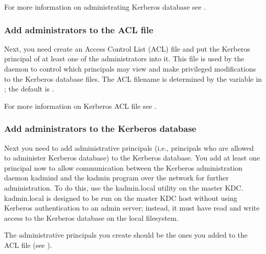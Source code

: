 \documentclass[letterpaper,10pt,english]{sphinxmanual}
\begin{document}
For more information on administrating Kerberos database see
{\hyperref[\detokenize{admin/database:db-operations}]{}}.


\subsubsection{Add administrators to the ACL file}
\label{\detokenize{admin/install_kdc:add-administrators-to-the-acl-file}}\label{\detokenize{admin/install_kdc:admin-acl}}
Next, you need create an Access Control List (ACL) file and put the
Kerberos principal of at least one of the administrators into it.
This file is used by the {\hyperref[\detokenize{admin/admin_commands/kadmind:kadmind-8}]{}} daemon to control which
principals may view and make privileged modifications to the Kerberos
database files.  The ACL filename is determined by the 
variable in {\hyperref[\detokenize{admin/conf_files/kdc_conf:kdc-conf-5}]{}}; the default is {\hyperref[\detokenize{mitK5defaults:paths}]{}}.

For more information on Kerberos ACL file see {\hyperref[\detokenize{admin/conf_files/kadm5_acl:kadm5-acl-5}]{}}.


\subsubsection{Add administrators to the Kerberos database}
\label{\detokenize{admin/install_kdc:add-administrators-to-the-kerberos-database}}\label{\detokenize{admin/install_kdc:addadmin-kdb}}
Next you need to add administrative principals (i.e., principals who
are allowed to administer Kerberos database) to the Kerberos database.
You  add at least one principal now to allow communication
between the Kerberos administration daemon kadmind and the kadmin
program over the network for further administration.  To do this, use
the kadmin.local utility on the master KDC.  kadmin.local is designed
to be run on the master KDC host without using Kerberos authentication
to an admin server; instead, it must have read and write access to the
Kerberos database on the local filesystem.

The administrative principals you create should be the ones you added
to the ACL file (see {\hyperref[\detokenize{admin/install_kdc:admin-acl}]{}}).
\end{document}

